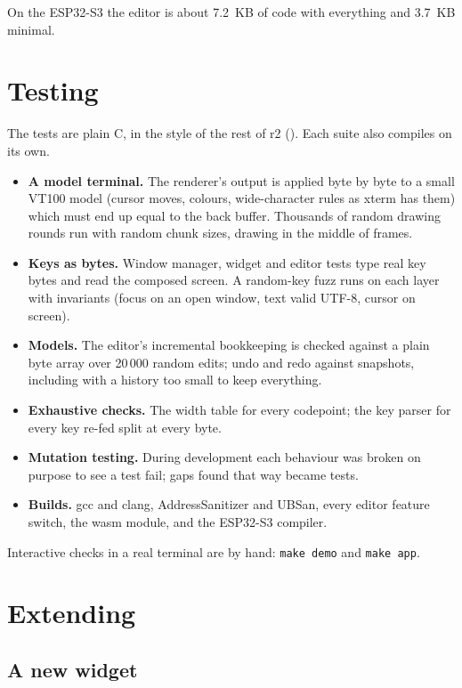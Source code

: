 \documentclass[11pt,a4paper]{article}
\newcommand{\fn}[1]{\texttt{\detokenize{#1}}}
\begin{document}
On the ESP32-S3 the editor is about 7.2~KB of code with everything and
3.7~KB minimal.

\section{Testing}

The tests are plain C, in the style of the rest of r2 (\fn{r2_unit.h}). Each
suite also compiles on its own.

\begin{itemize}
\item \textbf{A model terminal.} The renderer's output is applied byte by byte
  to a small VT100 model (cursor moves, colours, wide-character rules as
  xterm has them) which must end up equal to the back buffer. Thousands of
  random drawing rounds run with random chunk sizes, drawing in the middle of
  frames.
\item \textbf{Keys as bytes.} Window manager, widget and editor tests type real
  key bytes and read the composed screen. A random-key fuzz runs on each
  layer with invariants (focus on an open window, text valid UTF-8, cursor on
  screen).
\item \textbf{Models.} The editor's incremental bookkeeping is checked against
  a plain byte array over 20\,000 random edits; undo and redo against
  snapshots, including with a history too small to keep everything.
\item \textbf{Exhaustive checks.} The width table for every codepoint; the
  key parser for every key re-fed split at every byte.
\item \textbf{Mutation testing.} During development each behaviour was broken
  on purpose to see a test fail; gaps found that way became tests.
\item \textbf{Builds.} gcc and clang, AddressSanitizer and UBSan, every editor
  feature switch, the wasm module, and the ESP32-S3 compiler.
\end{itemize}

Interactive checks in a real terminal are by hand: \texttt{make demo} and
\texttt{make app}.

\section{Extending}

\subsection{A new widget}
\end{document}
